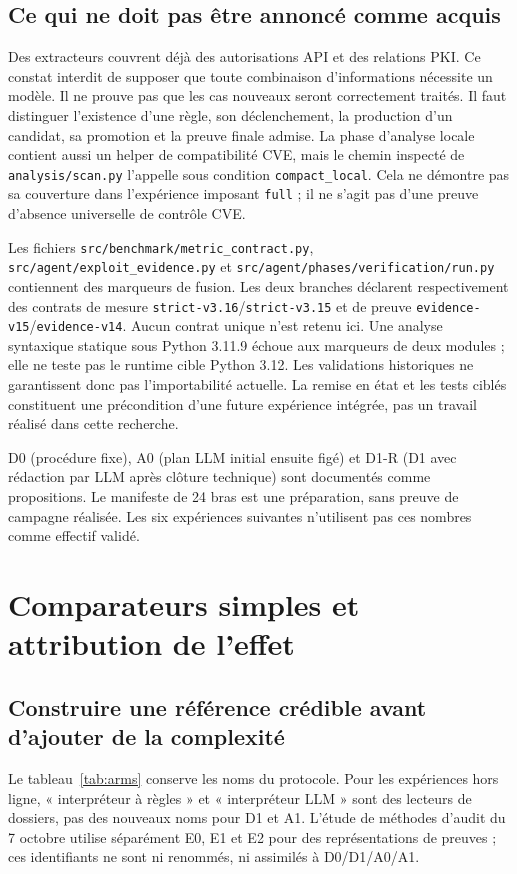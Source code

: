 \documentclass[11pt,a4paper]{article}
\newcommand{\fichier}[1]{\nolinkurl{#1}}
\begin{document}
\subsection{Ce qui ne doit pas être annoncé comme acquis}
Des extracteurs couvrent déjà des autorisations API et des relations PKI.
Ce constat interdit de supposer que toute combinaison d'informations nécessite
un modèle. Il ne prouve pas que les cas nouveaux seront correctement traités.
Il faut distinguer l'existence d'une règle, son déclenchement, la production
d'un candidat, sa promotion et la preuve finale admise. La phase d'analyse
locale contient aussi un helper de compatibilité CVE, mais le chemin inspecté
de \fichier{analysis/scan.py} l'appelle sous condition \texttt{compact\_local}.
Cela ne démontre pas sa couverture dans l'expérience imposant \texttt{full} ;
il ne s'agit pas d'une preuve d'absence universelle de contrôle CVE.

Les fichiers \fichier{src/benchmark/metric_contract.py},
\fichier{src/agent/exploit_evidence.py} et
\fichier{src/agent/phases/verification/run.py} contiennent des marqueurs de
fusion. Les deux branches déclarent respectivement des contrats de mesure
\texttt{strict-v3.16}/\texttt{strict-v3.15} et de preuve
\texttt{evidence-v15}/\texttt{evidence-v14}. Aucun contrat unique n'est retenu
ici. Une analyse syntaxique statique sous Python 3.11.9 échoue aux marqueurs
de deux modules ; elle ne teste pas le runtime cible Python 3.12. Les
validations historiques ne garantissent donc pas l'importabilité actuelle.
La remise en état et les tests ciblés constituent une précondition d'une
future expérience intégrée, pas un travail réalisé dans cette recherche.

D0 (procédure fixe), A0 (plan LLM initial ensuite figé) et D1-R (D1 avec
rédaction par LLM après clôture technique) sont documentés comme propositions.
Le manifeste de 24 bras est une préparation, sans preuve de campagne réalisée.
Les six expériences suivantes n'utilisent pas ces nombres comme effectif validé.

\section{Comparateurs simples et attribution de l'effet}
\subsection{Construire une référence crédible avant d'ajouter de la complexité}
Le tableau~\ref{tab:arms} conserve les noms du protocole. Pour les expériences
hors ligne, « interpréteur à règles » et « interpréteur LLM » sont des lecteurs
de dossiers, pas des nouveaux noms pour D1 et A1. L'étude de méthodes d'audit
du 7 octobre utilise séparément E0, E1 et E2 pour des représentations de preuves ;
ces identifiants ne sont ni renommés, ni assimilés à D0/D1/A0/A1.
\end{document}
